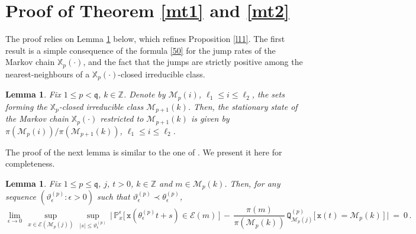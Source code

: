\documentclass[reqno]{amsart}
\theoremstyle{plain}
\newtheorem{lemma}[theorem]{Lemma}
\theoremstyle{definition}
\newcommand{\mf}[1]{{\mathfrak #1}}
\newcommand{\bb}[1]{{\mathbb #1}}
\newcommand{\ms}[1]{{\mathscr #1}}
\newcommand{\mtt}[1]{{\mathtt #1}}
\newcounter{as}[section]
\newcommand{\<}{\langle}
\renewcommand{\>}{\rangle}
\begin{document}
\section{Proof of Theorem \ref{mt1} and \ref{mt2}}
\label{sec9}

The proof relies on Lemma \ref{l36} below, which refines Proposition
\ref{l11}.  The first result is a simple consequence of the formula
\eqref{50} for the jump rates of the Markov chain $\bb X_p(\cdot)$,
and the fact that the jumps are strictly positive among the
nearest-neighbours of a $\bb X_p(\cdot)$-closed irreducible class.

\begin{lemma}
\label{l39}
Fix $1\le p< \mf q$, $k\in \bb Z$. Denote by $\ms M_{p}(i)$,
$\ell_1\le i\le \ell_2$, the sets forming the $\bb X_p$-closed
irreducible class $\ms M_{p+1}(k)$.  Then, the
stationary state of the Markov chain $\bb X_p(\cdot)$ restricted to
$\ms M_{p+1}(k)$ is given by $\pi(\ms M_{p}(i))/\pi(\ms M_{p+1}(k))$,
$\ell_1\le i\le \ell_2$.
\end{lemma}

The proof of the next lemma is similar to the one of \cite[Lemma
12.8]{lls2}. We present it here for completeness.

\begin{lemma}
\label{l36}
Fix $1\le p\le \mf q$, $j$, $t>0$, $k\in\bb Z$ and $m \in \ms M_p(k)$.
Then, for any sequence $(\vartheta^{(p)}_{\epsilon} :\epsilon>0)$ such
that $\vartheta^{(p)}_{\epsilon}\prec\theta_{\epsilon}^{(p)}$,
\begin{equation*}
\lim_{\epsilon\to 0}\, \sup_{x \in\mathcal{E}(\ms M_p(j))}\,
\sup_{|s|\le\vartheta^{(p)}_\epsilon}\,\Big|\,
\mathbb{P}_{x}^{\epsilon} \big[\,\mtt x(\theta_{\epsilon}^{(p)}t+s)
\in\mathcal{E}(m)\,\big] \,-\,
\frac{\pi (m)}{\pi(\ms M_p(k))}
\,\mtt {Q}_{\ms M_p(j)}^{(p)}\big[\, \mtt
x(t)= \ms M_p(k)\,\big]\,\Big|\ =\ 0\,. 
\end{equation*}
\end{lemma}
\end{document}
